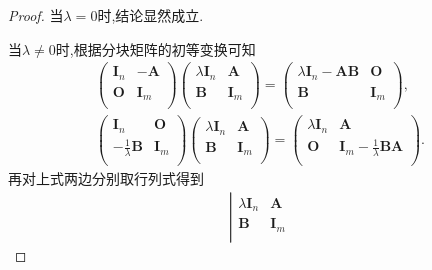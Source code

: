 \documentclass[lang=cn,newtx,10pt,scheme=chinese]{elegantbook}
\begin{document}
\begin{proof}
    当$\lambda=0$时,结论显然成立.

    当$\lambda\ne 0$时,根据分块矩阵的初等变换可知
    \begin{gather*}
        \left( \begin{matrix}
            \boldsymbol{I}_n&		-\boldsymbol{A}\\
            \boldsymbol{O}&		\boldsymbol{I}_m\\
        \end{matrix} \right) \left( \begin{matrix}
            \lambda \boldsymbol{I}_n&		\boldsymbol{A}\\
            \boldsymbol{B}&		\boldsymbol{I}_m\\
        \end{matrix} \right) =\left( \begin{matrix}
            \lambda \boldsymbol{I}_n-\boldsymbol{AB}&		\boldsymbol{O}\\
            \boldsymbol{B}&		\boldsymbol{I}_m\\
        \end{matrix} \right) ,
        \\
        \left( \begin{matrix}
            \boldsymbol{I}_n&		\boldsymbol{O}\\
            -\frac{1}{\lambda}\boldsymbol{B}&		\boldsymbol{I}_m\\
        \end{matrix} \right) \left( \begin{matrix}
            \lambda \boldsymbol{I}_n&		\boldsymbol{A}\\
            \boldsymbol{B}&		\boldsymbol{I}_m\\
        \end{matrix} \right) =\left( \begin{matrix}
            \lambda \boldsymbol{I}_n&		\boldsymbol{A}\\
            \boldsymbol{O}&		\boldsymbol{I}_m-\frac{1}{\lambda}\boldsymbol{BA}\\
        \end{matrix} \right) .
    \end{gather*}
    再对上式两边分别取行列式得到
    \begin{gather*}
        \left| \begin{matrix}
            \lambda \boldsymbol{I}_n&		\boldsymbol{A}\\
            \boldsymbol{B}&		\boldsymbol{I}_m\\

\end{matrix}
\end{gather*}
\end{proof}
\end{document}
